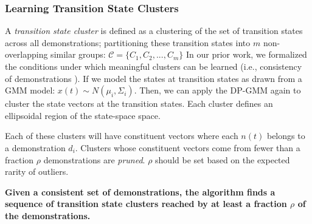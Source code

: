 \subsubsection{Learning Transition State Clusters}
A \emph{transition state cluster} is
defined as a clustering of the set of transition states across all demonstrations; partitioning these transition states into $m$ non-overlapping similar groups:
$
\mathcal{C} = \{C_1, C_2,...,C_m\}
$
In our prior work, we formalized the conditions under which meaningful clusters can be learned (i.e., consistency of demonstrations \cite{krishnan2015tsc}).
If we model the states at transition states as drawn from a GMM model: ${x}(t) \sim N(\mu_i, \Sigma_i)$.
Then, we can apply the DP-GMM again to cluster the state vectors at the transition states.
Each cluster defines an ellipsoidal region of the state-space space.

Each of these clusters will have constituent vectors where each $n(t)$ belongs to a demonstration $d_i$. 
Clusters whose constituent vectors come from fewer than a fraction $\rho$ demonstrations are \emph{pruned}.
$\rho$ should be set based on the expected rarity of outliers.

\vspace{0.5em}

\noindent \textbf{Given a consistent set of demonstrations, the algorithm finds a sequence of transition state clusters reached by at least a fraction $\rho$ of the demonstrations.}

